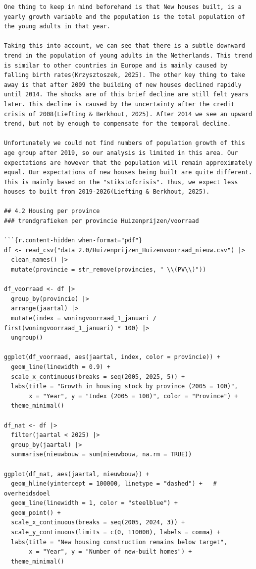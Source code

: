 \documentclass[
]{article}
\begin{document}
\begin{verbatim}
One thing to keep in mind beforehand is that New houses built, is a yearly growth variable and the population is the total population of the young adults in that year.

Taking this into account, we can see that there is a subtle downward trend in the population of young adults in the Netherlands. This trend is similar to other countries in Europe and is mainly caused by falling birth rates(Krzysztoszek, 2025). The other key thing to take away is that after 2009 the building of new houses declined rapidly until 2014. The shocks are of this brief decline are still felt years later. This decline is caused by the uncertainty after the credit crisis of 2008(Liefting & Berkhout, 2025). After 2014 we see an upward trend, but not by enough to compensate for the temporal decline.

Unfortunately we could not find numbers of population growth of this age group after 2019, so our analysis is limited in this area. Our expectations are however that the population will remain approximately equal. Our expectations of new houses being built are quite different. This is mainly based on the "stikstofcrisis". Thus, we expect less houses to built from 2019-2026(Liefting & Berkhout, 2025).

## 4.2 Housing per province
### trendgrafieken per provincie Huizenprijzen/voorraad

```{r.content-hidden when-format="pdf"}
df <- read_csv("data 2.0/Huizenprijzen_Huizenvoorraad_nieuw.csv") |> 
  clean_names() |> 
  mutate(provincie = str_remove(provincies, " \\(PV\\)"))

df_voorraad <- df |> 
  group_by(provincie) |> 
  arrange(jaartal) |> 
  mutate(index = woningvoorraad_1_januari / first(woningvoorraad_1_januari) * 100) |> 
  ungroup()

ggplot(df_voorraad, aes(jaartal, index, color = provincie)) +
  geom_line(linewidth = 0.9) +
  scale_x_continuous(breaks = seq(2005, 2025, 5)) +
  labs(title = "Growth in housing stock by province (2005 = 100)",
       x = "Year", y = "Index (2005 = 100)", color = "Province") +
  theme_minimal()

df_nat <- df |> 
  filter(jaartal < 2025) |> 
  group_by(jaartal) |> 
  summarise(nieuwbouw = sum(nieuwbouw, na.rm = TRUE))

ggplot(df_nat, aes(jaartal, nieuwbouw)) +
  geom_hline(yintercept = 100000, linetype = "dashed") +   # overheidsdoel
  geom_line(linewidth = 1, color = "steelblue") +
  geom_point() +
  scale_x_continuous(breaks = seq(2005, 2024, 3)) +
  scale_y_continuous(limits = c(0, 110000), labels = comma) +
  labs(title = "New housing construction remains below target",
       x = "Year", y = "Number of new-built homes") +
  theme_minimal()


\end{verbatim}
\end{document}
